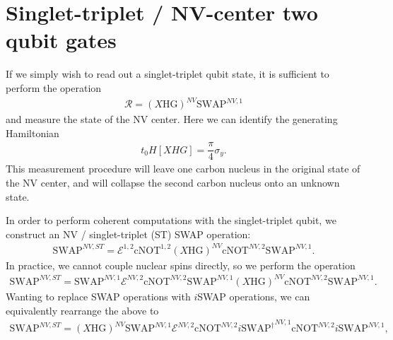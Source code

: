 \documentclass[11pt]{article}
\renewcommand{\t}{\text} %
\newcommand{\f}[2]{\dfrac{#1}{#2}} %
\newcommand{\p}[1]{\left(#1\right)} %
\renewcommand{\sp}[1]{\left[#1\right]} %
\newcommand{\E}{\mathcal E}
\begin{document}
\newpage
\section*{Singlet-triplet / NV-center two qubit gates}

If we simply wish to read out a singlet-triplet qubit state, it is
sufficient to perform the operation
\begin{align}
  \mathcal R=\p{X\t{HG}}^{NV}\t{SWAP}^{NV,1}
\end{align}
and measure the state of the NV center. Here we can identify the
generating Hamiltonian
\begin{align}
  t_0H\sp{XHG}=\f\pi4\sigma_y.
\end{align}
This measurement procedure will leave one carbon nucleus in the
original state of the NV center, and will collapse the second carbon
nucleus onto an unknown state.

In order to perform coherent computations with the singlet-triplet
qubit, we construct an NV / singlet-triplet (ST) SWAP operation:
\begin{align}
  \t{SWAP}^{NV,ST}=\E^{1,2}\t{cNOT}^{1,2}
  \p{X\t{HG}}^{NV}\t{cNOT}^{NV,2}\t{SWAP}^{NV,1}.
\end{align}
In practice, we cannot couple nuclear spins directly, so we perform
the operation
\begin{align}
  \t{SWAP}^{NV,ST}=\t{SWAP}^{NV,1}\E^{NV,2}\t{cNOT}^{NV,2}
  \t{SWAP}^{NV,1}\p{X\t{HG}}^{NV}\t{cNOT}^{NV,2}\t{SWAP}^{NV,1}.
\end{align}
Wanting to replace SWAP operations with $i$SWAP operations, we can
equivalently rearrange the above to
\begin{align}
  \t{SWAP}^{NV,ST}=\p{X\t{HG}}^{NV}\t{SWAP}^{NV,1}\E^{NV,2}
  \t{cNOT}^{NV,2}{i\t{SWAP}^\dag}^{NV,1}\t{cNOT}^{NV,2}i\t{SWAP}^{NV,1},
  \label{swap_own}
\end{align}
\end{document}
